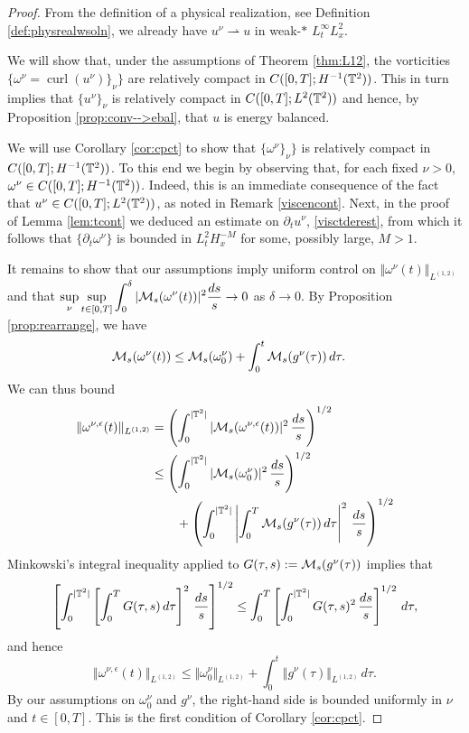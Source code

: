 \documentclass[reqno,12pt]{amsart}
\DeclareMathOperator{\curl}{curl}
\begin{document}
\begin{proof}
From the definition of a physical realization, see Definition \ref{def:physrealwsoln}, we already have $u^\nu \rightharpoonup u$ in weak-$\ast$ $L^\infty_tL^2_x$.

We will show that, under the assumptions of Theorem \ref{thm:L12}, the vorticities
$\{\omega^\nu = \curl (u^\nu) \}_\nu\}$ are relatively compact in $C([0,T];H^{-1}(\mathbb{T}^2))$. This in turn implies that $\{u^\nu\}_{\nu}$ is relatively compact in $C([0,T];L^2(\mathbb{T}^2))$ and hence, by Proposition \ref{prop:conv-->ebal}, that $u$ is energy balanced.

  We will use Corollary \ref{cor:cpct} to show that $\{\omega^\nu \}_\nu\}$ is relatively compact in $C([0,T];H^{-1}(\mathbb{T}^2))$. To this end we begin by observing that, for each fixed $\nu>0$, $\omega^\nu \in C([0,T];H^{-1}(\mathbb{T}^2))$. Indeed, this is an immediate consequence of the fact that $u^\nu \in C([0,T];L^2(\mathbb{T}^2))$, as noted in Remark \ref{viscencont}. Next, in the proof of Lemma \ref{lem:tcont} we deduced an estimate on $\partial_t u^\nu$, \eqref{visctderest}, from which it follows that $\{\partial_t \omega^\nu\}$ is bounded in $L^2_t H^{-M}_x$ for some, possibly large, $M>1$.


 It remains to show that our assumptions imply uniform control on $\Vert \omega^\nu(t) \Vert_{L^{(1,2)}} $ and that $ \displaystyle{\sup_\nu \sup_{t\in[0,T]} \int_0^\delta | \mathcal{M}_s(\omega^\nu(t)) |^2 \frac{ds}{s}} \to 0$ as $\delta \to 0$. By Proposition \ref{prop:rearrange}, we have
  \begin{align*}
\mathcal{M}_s (\omega^{\nu}(t))
&\le
\mathcal{M}_s (\omega^{\nu}_0)
+
\int_0^t \mathcal{M}_s (g^{\nu}(\tau)) \, d\tau.
\end{align*}
We can thus bound
\begin{align*}
\Vert \omega^{\nu,\epsilon}(t)\Vert_{L^{(1,2)}}
&=
\left(
\int_{0}^{|\mathbb{T}^2|}
|\mathcal{M}_s (\omega^{\nu,\epsilon}(t))|^2
\, \frac{ds}{s}
\right)^{1/2}
\\
&\le
\left(
\int_{0}^{|\mathbb{T}^2|}
|\mathcal{M}_s (\omega_0^{\nu})|^2
\, \frac{ds}{s}
\right)^{1/2}
\\
&\qquad
+
\left(
\int_{0}^{|\mathbb{T}^2|}
\left|
\int_0^T
\mathcal{M}_s (g^{\nu}(\tau))
\, d\tau
\right|^2 \, \frac{ds}{s}
\right)^{1/2}
\end{align*}
Minkowski's integral inequality applied to $G(\tau,s) := \mathcal{M}_s (g^\nu(\tau))$ implies that
\begin{align*}
\left[
\int_{0}^{|\mathbb{T}^2|}
\left[
\int_0^T
G(\tau,s)
\, d\tau
\right]^2 \, \frac{ds}{s}
\right]^{1/2}
\le
\int_0^T \left[
\int_0^{|\mathbb{T}^2|} G(\tau,s)^2 \, \frac{ds}{s}
\right]^{1/2} \, d\tau,
\end{align*}
and hence
\[
\Vert \omega^{\nu,\epsilon}(t) \Vert_{L^{(1,2)}}
\le
\Vert \omega_0^\nu \Vert_{L^{(1,2)}}
+
\int_0^t \Vert g^\nu(\tau) \Vert_{L^{(1,2)}} \, d\tau.
\]
By our assumptions on $\omega_0^\nu$ and $g^\nu$, the right-hand side is bounded uniformly in $\nu$ and $t\in [0,T]$. This is the first condition of Corollary \ref{cor:cpct}.


\end{proof}
\end{document}
